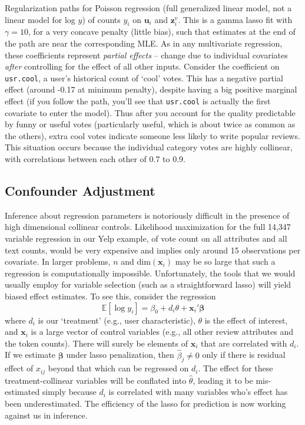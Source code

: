 \documentclass[12pt]{article}
\newcommand{\bs}[1]{\boldsymbol{#1}}
\newcommand{\mr}[1]{\mathrm{#1}}
\newcommand{\bm}[1]{\mathbf{#1}}
\newcommand{\ds}[1]{\mathds{#1}}
\newcommand{\cd}[1]{{\tt#1}}
\begin{document}
Regularization paths for
Poisson regression (full generalized linear model, not a linear model for
log $y$) of  counts $y_i$ on   $\bm{u}_i$ and
$\bm{z}^v_i$.  This is a gamma lasso fit with $\gamma =10$, for a very concave
penalty (little bias), such that estimates at the end of the path
are near the corresponding MLE.  As in any multivariate regression, these coefficients
represent {\it partial effects} --  change due to
 individual covariates {\it after} controlling for the effect of all other
inputs.  Consider the coefficient on \cd{usr.cool}, a user's historical
count of `cool' votes.  This has a negative partial effect (around -0.17 at
minimum penalty), despite having a big positive marginal effect (if you follow
the path, you'll see that \cd{usr.cool} is actually the first covariate to
enter the model).  Thus after you account for the quality
predictable by funny or useful votes (particularly useful, which is about
twice as common as the others), extra cool votes indicate someone less likely
to write popular reviews.  This situation occurs because the individual
category votes are highly collinear, with correlations between each other of
0.7 to 0.9.

\subsection{Confounder Adjustment}

Inference about regression parameters is notoriously difficult in the presence of high dimensional collinear controls.  Likelihood maximization for the full 14,347
variable regression in our Yelp example, of vote count on all attributes and all text counts,  would be very expensive and implies only around 15 observations per covariate.  
In larger problems, $n$ and $\mr{dim}(\bm{x}_i)$ may be so large that such a regression is computationally impossible.
Unfortunately, the tools that we would usually employ for variable selection (such as a straightforward lasso) will yield biased effect estimates.  To see this, consider
the regression 
\begin{equation}\label{teffects}
\ds{E}[\log y_i] = \beta_0 + d_i\theta  + \bm{x}_i'\bs{\beta}
\end{equation}
where $d_i$ is our `treatment' (e.g., user characteristic), $\theta$ is
the effect of interest, and $\bm{x}_i$ is a large vector of control
variables (e.g., all other review attributes and the token counts).   There
will surely be elements of $\bm{x}_i$ that are correlated with $d_i$. If
we estimate $\bs{\beta}$ under lasso penalization, 
then $\hat\beta_j \neq 0$ only if there is 
residual effect of $x_{ij}$ beyond that which can be regressed on $d_i$.  The
 effect for these treatment-collinear variables will be conflated
into $\hat\theta$, leading it to be mis-estimated simply because $d_i$ is correlated with many
variables who's effect has been underestimated.  The efficiency of the lasso
for prediction is now working against us in inference.
\end{document}
